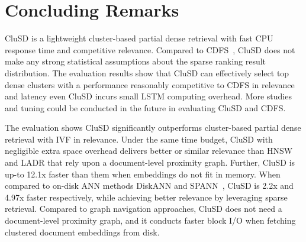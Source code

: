 \vspace*{-4mm}
\section{Concluding Remarks}

CluSD is a lightweight cluster-based partial dense retrieval with
fast CPU response time and competitive relevance.
Compared to CDFS~\cite{2024SIGIR-CDFS-Yang},
CluSD does not make any strong statistical assumptions about the sparse ranking result distribution.
The evaluation results show that  CluSD can effectively select top dense
clusters with a performance  reasonably competitive to CDFS in relevance and latency
even CluSD incurs small LSTM computing overhead.  
More studies and tuning could be conducted
in the future in evaluating CluSD and CDFS.
     

The evaluation shows CluSD significantly outperforms cluster-based partial dense retrieval with IVF in relevance.
Under the same time budget, CluSD with negligible extra space overhead 
delivers better or similar relevance than HNSW and LADR that rely upon
a document-level proximity graph.
Further, CluSD is up-to 12.1x faster than them
when embeddings 
do not fit in memory.
When compared to on-disk ANN methods DiskANN and SPANN~\cite{NEURIPS2019_DiskANN,2023Web-Filtered-DiskANN},
CluSD is 2.2x and 4.97x faster respectively, while achieving better relevance
by leveraging sparse retrieval.
Compared to graph navigation approaches, 
CluSD does not need  a  document-level proximity graph,  and  it conducts faster block I/O when fetching clustered document embeddings  
from disk.  

